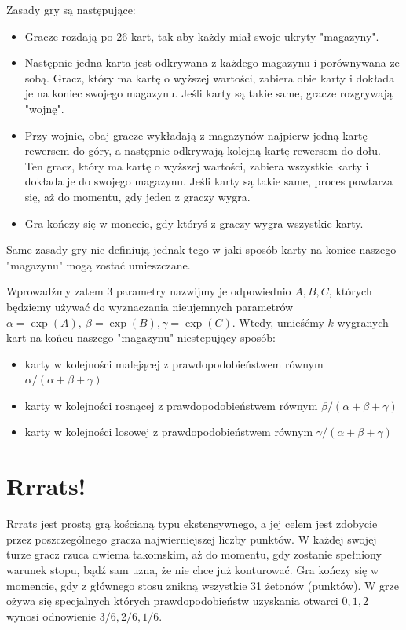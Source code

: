\documentclass[inzynierska]{pwr_wmat_praca_dyplomowa}
\theoremstyle{plain}
\numberwithin{theorem}{chapter}
\theoremstyle{definition}
\numberwithin{theorem}{chapter}
\begin{document}
	Zasady gry są następujące:
	\begin{itemize}
		\item 	Gracze rozdają po 26 kart, tak aby każdy miał swoje ukryty "magazyny".
		
		\item Następnie jedna karta jest odkrywana z każdego magazynu i porównywana ze sobą. Gracz, który ma kartę o wyższej wartości, zabiera obie karty i dokłada je na koniec swojego magazynu. Jeśli karty są takie same, gracze rozgrywają "wojnę".
		
		\item Przy wojnie, obaj gracze wykładają z magazynów najpierw jedną kartę rewersem do góry, a następnie odkrywają kolejną kartę rewersem do dołu. Ten gracz, który ma kartę o wyższej wartości, zabiera wszystkie karty i dokłada je do swojego magazynu. Jeśli karty są takie same, proces powtarza się, aż do momentu, gdy jeden z graczy wygra.
		
		\item Gra kończy się w monecie, gdy któryś z graczy wygra wszystkie karty.
	\end{itemize}
	Same zasady gry nie definiują jednak tego w jaki sposób karty na koniec naszego "magazynu" mogą zostać umieszczane.
	
	Wprowadźmy zatem 3 parametry nazwijmy je odpowiednio $A, B, C$, których będziemy używać do wyznaczania nieujemnych parametrów $\alpha = \exp(A), \
	\beta= \exp(B), \gamma= \exp(C)$. Wtedy, umieśćmy $k$ wygranych kart na końcu naszego "magazynu" niestepujący sposób:
	\begin{itemize}
		\item karty w kolejności malejącej z prawdopodobieństwem równym $\alpha/(\alpha+\beta+\gamma)$ 
		
		\item karty w kolejności rosnącej z prawdopodobieństwem równym $\beta/(\alpha+\beta+\gamma)$ 
		
		\item karty w kolejności losowej z prawdopodobieństwem równym $\gamma/(\alpha+\beta+\gamma)$ 
	\end{itemize}
	
	\section{Rrrats!}
	Rrrats jest prostą grą kościaną typu ekstensywnego, a jej celem jest zdobycie przez poszczególnego gracza najwierniejszej liczby punktów. W każdej swojej turze gracz rzuca dwiema takomskim, aż do momentu, gdy zostanie spełniony warunek stopu, bądź sam uzna, że nie chce już konturować. Gra kończy się w momencie, gdy z głównego stosu znikną wszystkie 31 żetonów (punktów). W grze ożywa się specjalnych których prawdopodobieństw uzyskania otwarci $0, 1, 2$ wynosi odnowienie $3/6, 2/6, 1/6$.
\end{document}
